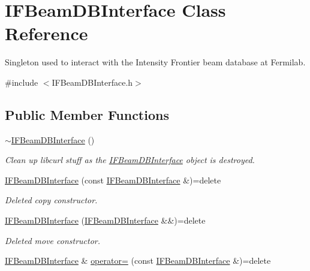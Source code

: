 \hypertarget{classIFBeamDBInterface}{\section{I\-F\-Beam\-D\-B\-Interface Class Reference}
\label{classIFBeamDBInterface}
}


Singleton used to interact with the Intensity Frontier beam database at Fermilab.  




{\ttfamily \#include $<$I\-F\-Beam\-D\-B\-Interface.\-h$>$}

\subsection*{Public Member Functions}
\begin{DoxyCompactItemize}
\item 
\hypertarget{classIFBeamDBInterface_ac6e95cfed4db9c455289234f26a2f1c1}{\hyperlink{classIFBeamDBInterface_ac6e95cfed4db9c455289234f26a2f1c1}{$\sim$\-I\-F\-Beam\-D\-B\-Interface} ()}\label{classIFBeamDBInterface_ac6e95cfed4db9c455289234f26a2f1c1}

\begin{DoxyCompactList}\small\item\em Clean up libcurl stuff as the \hyperlink{classIFBeamDBInterface}{I\-F\-Beam\-D\-B\-Interface} object is destroyed. \end{DoxyCompactList}\item 
\hypertarget{classIFBeamDBInterface_aac246a02f0726c599a8bd6db201c9c81}{\hyperlink{classIFBeamDBInterface_aac246a02f0726c599a8bd6db201c9c81}{I\-F\-Beam\-D\-B\-Interface} (const \hyperlink{classIFBeamDBInterface}{I\-F\-Beam\-D\-B\-Interface} \&)=delete}\label{classIFBeamDBInterface_aac246a02f0726c599a8bd6db201c9c81}

\begin{DoxyCompactList}\small\item\em Deleted copy constructor. \end{DoxyCompactList}\item 
\hypertarget{classIFBeamDBInterface_ae53bfb59f783375aeb96e520e1b8a4c8}{\hyperlink{classIFBeamDBInterface_ae53bfb59f783375aeb96e520e1b8a4c8}{I\-F\-Beam\-D\-B\-Interface} (\hyperlink{classIFBeamDBInterface}{I\-F\-Beam\-D\-B\-Interface} \&\&)=delete}\label{classIFBeamDBInterface_ae53bfb59f783375aeb96e520e1b8a4c8}

\begin{DoxyCompactList}\small\item\em Deleted move constructor. \end{DoxyCompactList}\item 
\hypertarget{classIFBeamDBInterface_ad3af28661e5c86ba91c795f841678188}{\hyperlink{classIFBeamDBInterface}{I\-F\-Beam\-D\-B\-Interface} \& \hyperlink{classIFBeamDBInterface_ad3af28661e5c86ba91c795f841678188}{operator=} (const \hyperlink{classIFBeamDBInterface}{I\-F\-Beam\-D\-B\-Interface} \&)=delete}\label{classIFBeamDBInterface_ad3af28661e5c86ba91c795f841678188}


\end{DoxyCompactItemize}
